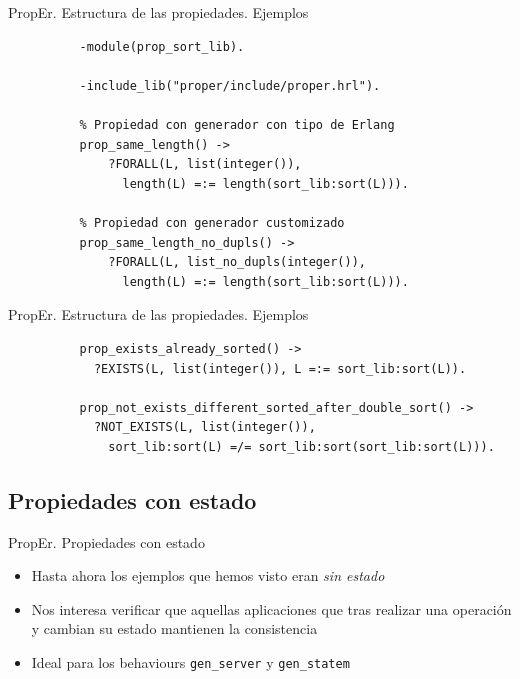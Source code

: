 \documentclass{beamer}
\begin{document}
      \begin{frame}[fragile]{PropEr. Estructura de las propiedades. Ejemplos}
        \begin{verbatim}
          -module(prop_sort_lib).

          -include_lib("proper/include/proper.hrl").

          % Propiedad con generador con tipo de Erlang
          prop_same_length() ->
              ?FORALL(L, list(integer()),
                length(L) =:= length(sort_lib:sort(L))).

          % Propiedad con generador customizado
          prop_same_length_no_dupls() ->
              ?FORALL(L, list_no_dupls(integer()),
                length(L) =:= length(sort_lib:sort(L))).
        \end{verbatim}
      \end{frame}

      \begin{frame}[fragile]{PropEr. Estructura de las propiedades. Ejemplos}
        \begin{verbatim}
          prop_exists_already_sorted() ->
            ?EXISTS(L, list(integer()), L =:= sort_lib:sort(L)).

          prop_not_exists_different_sorted_after_double_sort() ->
            ?NOT_EXISTS(L, list(integer()),
              sort_lib:sort(L) =/= sort_lib:sort(sort_lib:sort(L))).

        \end{verbatim}
      \end{frame}

    \subsection{Propiedades con estado}
      \begin{frame}{PropEr. Propiedades con estado}
        \begin{itemize}
          \item Hasta ahora los ejemplos que hemos visto eran \textit{sin estado}
          \item Nos interesa verificar que aquellas aplicaciones que tras realizar
          una operación y cambian su estado mantienen la consistencia
          \item Ideal para los behaviours \texttt{gen_server} y
          \texttt{gen_statem}
        \end{itemize}
      \end{frame}
\end{document}

